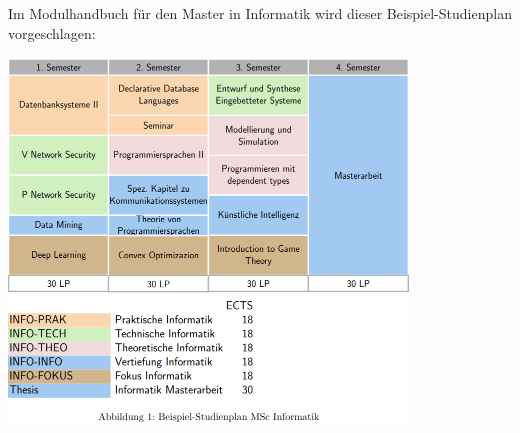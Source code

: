 \ifinfo
	\iflehramt
	\else
	Im Modulhandbuch für den Master in Informatik wird dieser Beispiel-Studienplan vorgeschlagen:
	\begin{center}
		\includegraphics[width=0.8\textwidth]{media/studienplan_msc.png}
	\end{center}
	\newpage
	\fi
\fi
